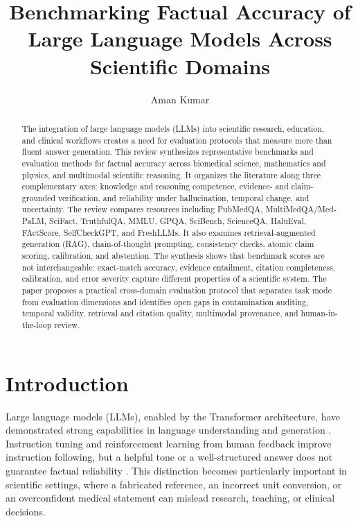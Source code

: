 \documentclass[manuscript,nonacm]{acmart}
\begin{document}
\title{Benchmarking Factual Accuracy of Large Language Models Across Scientific Domains}

\author{Aman Kumar}

\begin{abstract}
The integration of large language models (LLMs) into scientific research, education, and clinical workflows creates a need for evaluation protocols that measure more than fluent answer generation. This review synthesizes representative benchmarks and evaluation methods for factual accuracy across biomedical science, mathematics and physics, and multimodal scientific reasoning. It organizes the literature along three complementary axes: knowledge and reasoning competence, evidence- and claim-grounded verification, and reliability under hallucination, temporal change, and uncertainty. The review compares resources including PubMedQA, MultiMedQA/Med-PaLM, SciFact, TruthfulQA, MMLU, GPQA, SciBench, ScienceQA, HaluEval, FActScore, SelfCheckGPT, and FreshLLMs. It also examines retrieval-augmented generation (RAG), chain-of-thought prompting, consistency checks, atomic claim scoring, calibration, and abstention. The synthesis shows that benchmark scores are not interchangeable: exact-match accuracy, evidence entailment, citation completeness, calibration, and error severity capture different properties of a scientific system. The paper proposes a practical cross-domain evaluation protocol that separates task mode from evaluation dimensions and identifies open gaps in contamination auditing, temporal validity, retrieval and citation quality, multimodal provenance, and human-in-the-loop review.
\end{abstract}


\maketitle

\section{Introduction}\label{sec:introduction}
Large language models (LLMs), enabled by the Transformer architecture, have demonstrated strong capabilities in language understanding and generation \cite{vaswani2017attention,brown2020language}. Instruction tuning and reinforcement learning from human feedback improve instruction following, but a helpful tone or a well-structured answer does not guarantee factual reliability \cite{ouyang2022training}. This distinction becomes particularly important in scientific settings, where a fabricated reference, an incorrect unit conversion, or an overconfident medical statement can mislead research, teaching, or clinical decisions.
\end{document}
